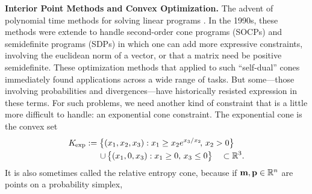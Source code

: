 \documentclass[twoside]{article}
\begin{document}
%
\textbf{Interior Point Methods and Convex Optimization.}
The advent of polynomial time methods for solving linear programs
\parencite{}.
In the 1990s, these methods were extende to handle second-order cone programs (SOCPs) and semidefinite programs (SDPs) in which one can add more expressive constraints,
    involving the euclidean norm of a vector, or that a matrix need be positive semidefinite.
These optimization methods that applied to such ``self-dual'' cones
    immediately found applications across a wide range of tasks.
But some---those involving probabilities and divergences---have historically
resisted expression in these terms. For such problems, we need another kind of constraint
that is a little more difficult to handle: an exponential cone constraint.
%
%
The exponential cone is the convex set
\begin{align*}
        \begin{aligned}
        K_{\mskip-1mu\exp} :=
        \big\{ (x_1, x_2, x_3) &:
                x_1 \ge x_2 e^{x_3 / x_2}\!,\, x_2 > 0 \big\}
            \\[-0.2ex]\quad \mathbin{\cup}\,
        \big\{ (x_1, 0, x_3&) : x_1 \ge 0,\, x_3 \le 0 \big\}
        \quad \subset \mathbb R^3.
    \end{aligned}
\end{align*}
It is also sometimes called the relative entropy cone, because
if $\mathbf{m}, \mathbf{p} \in \mathbb R^n$ are points on a probability simplex,
\end{document}
